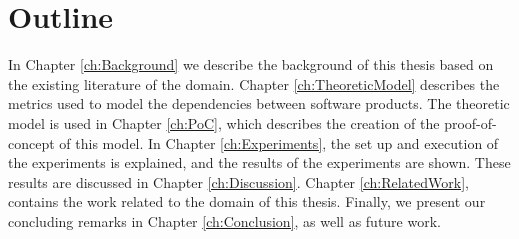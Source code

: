 \section{Outline}
In Chapter \ref{ch:Background} we describe the background of this thesis based on the existing literature of the domain.
Chapter \ref{ch:TheoreticModel} describes the metrics used to model the dependencies between software products.
The theoretic model is used in Chapter \ref{ch:PoC}, which describes the creation of the proof-of-concept of this model.
In Chapter \ref{ch:Experiments}, the set up and execution of the experiments is explained, and the results of the experiments are shown. These results are discussed in Chapter \ref{ch:Discussion}. Chapter \ref{ch:RelatedWork}, contains the work related to the domain of this thesis.
Finally, we present our concluding remarks in Chapter \ref{ch:Conclusion}, as well as future work.
